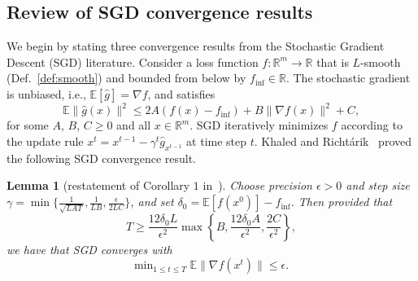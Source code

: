 \documentclass[
    reprint,
    aps,
    prx,
    longbibliography
]{revtex4-2}
\newtheorem{lemma}{Lemma}
\begin{document}
\subsection*{Review of SGD convergence results}

We begin by stating three convergence results from the Stochastic Gradient Descent (SGD) literature. Consider a loss function $f : \mathbb{R}^m \rightarrow \mathbb{R}$ that is $L$-smooth (Def.~\ref{def:smooth}) and bounded from below by $f_\mathrm{inf} \in \mathbb{R}$. The stochastic gradient is unbiased, i.e., $\mathbb{E}[\hat{g}] = \nabla f$, and satisfies 
\begin{equation}
    \mathbb{E} \| \hat{g}(x) \|^2  \leq 2A (f(x) - f_\mathrm{inf}) + B \| \nabla f(x) \|^2 + C ,
\end{equation}
for some $A$, $B$, $C \geq 0$ and all $x \in \mathbb{R}^m$.
SGD iteratively minimizes $f$ according to the update rule $x^t = x^{t-1} - \gamma^t \hat{g}_{x^{t-1}}$ at time step $t$. Khaled and Richt{\'a}rik~\cite{Khaled2020} proved the following SGD convergence result.

\begin{lemma}[restatement of Corollary $1$ in~\cite{Khaled2020}] 
\label{lem:sgd_conv_1}
Choose precision $\epsilon > 0$ and step size $\gamma = \min
\{ \frac{1}{\sqrt{LAT}}, \frac{1}{LB}, \frac{\epsilon}{2LC} \} $, and set $\delta_0 = \mathbb{E}[f(x^0)] - f_\mathrm{inf}$. Then provided that 
\begin{equation}
    T \geq \frac{12 \delta_0 L}{\epsilon^2} \max \left\{ B, \frac{12 \delta_0 A}{\epsilon^2}, \frac{2C}{\epsilon^2} \right\} , 
\end{equation}
we have that SGD converges with 
\begin{equation}
\mathrm{min}_{1\leq t \leq T} \; \mathbb{E}\|\nabla f(x^t)\| \leq \epsilon .
\end{equation}
\end{lemma}
\end{document}

